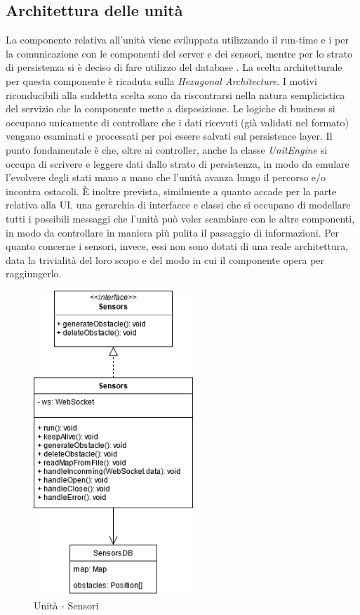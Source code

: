 \subsection{Architettura delle unità}
	La componente relativa all'unità viene sviluppata utilizzando il run-time  e i  per la comunicazione con le componenti del server e dei sensori, mentre per lo strato di persistenza si è deciso di fare utilizzo del database .
	La scelta architetturale per questa componente è ricaduta sulla \textit{Hexagonal Architecture}.
	I motivi riconducibili alla suddetta scelta sono da riscontrarsi nella natura semplicistica del servizio che la componente mette a disposizione. Le logiche di business si occupano unicamente di controllare che i dati ricevuti (già validati nel formato) vengano esaminati e processati per poi essere salvati sul persistence layer.
	Il punto fondamentale è che, oltre ai controller, anche la classe \textit{UnitEngine} si occupa di scrivere e leggere dati dallo strato di persistenza, in modo da emulare l'evolvere degli stati mano a mano che l'unità avanza lungo il percorso e/o incontra ostacoli.
	È inoltre prevista, similmente a quanto accade per la parte relativa alla UI, una gerarchia di interfacce e classi che si occupano di modellare tutti i possibili messaggi che l'unità può voler scambiare con le altre componenti, in modo da controllare in maniera più pulita il passaggio di informazioni.
	Per quanto concerne i sensori, invece, essi non sono dotati di una reale architettura, data la trivialità del loro scopo e del modo in cui il componente opera per raggiungerlo.

	\begin{figure}[H]
		\centering
		\includegraphics[width=6cm]{img/unit_sensori.png}
		\caption{Unità - Sensori}
	\end{figure}

